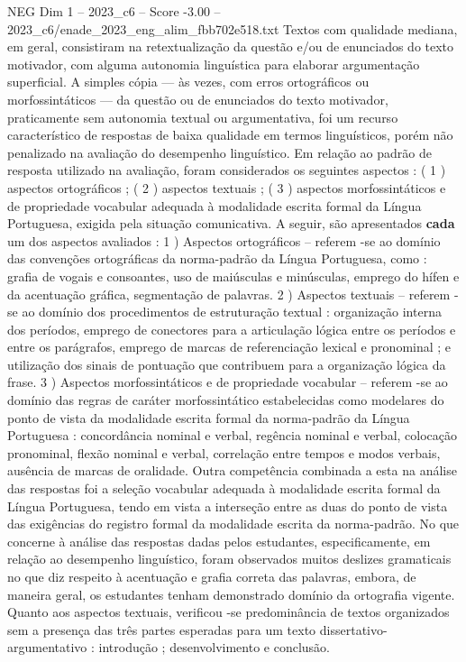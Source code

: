 \begin{textsample}{NEG Dim 1 – 2023\_c6 – Score -3.00 – 2023\_c6/enade\_2023\_eng\_alim\_fbb702e518.txt}
Textos com qualidade mediana, em geral, consistiram na retextualização da questão e/ou de enunciados do texto motivador, com alguma autonomia linguística para elaborar argumentação superficial.
A simples cópia — às vezes, com erros ortográficos ou morfossintáticos — da questão ou de enunciados do texto motivador, praticamente sem autonomia textual ou argumentativa, foi um recurso característico de respostas de baixa qualidade em termos linguísticos, porém não penalizado na avaliação do desempenho linguístico.
Em relação ao padrão de resposta utilizado na avaliação, foram considerados os seguintes aspectos : ( 1 ) aspectos ortográficos ; ( 2 ) aspectos textuais ; ( 3 ) aspectos morfossintáticos e de propriedade vocabular adequada à modalidade escrita formal da Língua Portuguesa, exigida pela situação comunicativa.
A seguir, são apresentados \textbf{cada} um dos aspectos avaliados : 1 ) Aspectos ortográficos – referem -se ao domínio das convenções ortográficas da norma-padrão da Língua Portuguesa, como : grafia de vogais e consoantes, uso de maiúsculas e minúsculas, emprego do hífen e da acentuação gráfica, segmentação de palavras. 2 ) Aspectos textuais – referem -se ao domínio dos procedimentos de estruturação textual : organização interna dos períodos, emprego de conectores para a articulação lógica entre os períodos e entre os parágrafos, emprego de marcas de referenciação lexical e pronominal ; e utilização dos sinais de pontuação que contribuem para a organização lógica da frase. 3 ) Aspectos morfossintáticos e de propriedade vocabular – referem -se ao domínio das regras de caráter morfossintático estabelecidas como modelares do ponto de vista da modalidade escrita formal da norma-padrão da Língua Portuguesa : concordância nominal e verbal, regência nominal e verbal, colocação pronominal, flexão nominal e verbal, correlação entre tempos e modos verbais, ausência de marcas de oralidade.
Outra competência combinada a esta na análise das respostas foi a seleção vocabular adequada à modalidade escrita formal da Língua Portuguesa, tendo em vista a interseção entre as duas do ponto de vista das exigências do registro formal da modalidade escrita da norma-padrão.
No que concerne à análise das respostas dadas pelos estudantes, especificamente, em relação ao desempenho linguístico, foram observados muitos deslizes gramaticais no que diz respeito à acentuação e grafia correta das palavras, embora, de maneira geral, os estudantes tenham demonstrado domínio da ortografia vigente.
Quanto aos aspectos textuais, verificou -se predominância de textos organizados sem a presença das três partes esperadas para um texto dissertativo-argumentativo : introdução ; desenvolvimento e conclusão.

\end{textsample}
